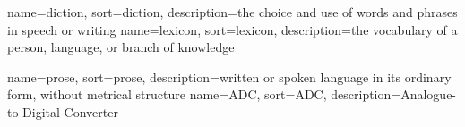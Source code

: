 


{
	name={diction},
	sort=diction,
	description={the choice and use of words and phrases in speech or writing}
}
{
	name={lexicon},
	sort=lexicon,
	description={the vocabulary of a person, language, or branch of knowledge}
}

{
	name={prose},
	sort=prose,
	description={written or spoken language in its ordinary form, without metrical structure}
}
{
	name={ADC},
	sort=ADC,
	description={Analogue-to-Digital Converter}
}







